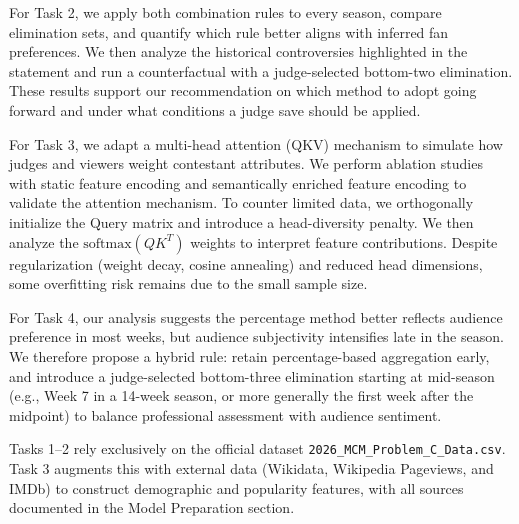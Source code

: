 For Task 2, we apply both combination rules to every season, compare elimination sets, and quantify which rule better aligns with inferred fan preferences. We then analyze the historical controversies highlighted in the statement and run a counterfactual with a judge-selected bottom-two elimination. These results support our recommendation on which method to adopt going forward and under what conditions a judge save should be applied.

For Task 3, we adapt a multi-head attention (QKV) mechanism to simulate how judges and viewers weight contestant attributes. We perform ablation studies with static feature encoding and semantically enriched feature encoding to validate the attention mechanism. To counter limited data, we orthogonally initialize the Query matrix and introduce a head-diversity penalty. We then analyze the \(\mathrm{softmax}(QK^T)\) weights to interpret feature contributions. Despite regularization (weight decay, cosine annealing) and reduced head dimensions, some overfitting risk remains due to the small sample size.

For Task 4, our analysis suggests the percentage method better reflects audience preference in most weeks, but audience subjectivity intensifies late in the season. We therefore propose a hybrid rule: retain percentage-based aggregation early, and introduce a judge-selected bottom-three elimination starting at mid-season (e.g., Week 7 in a 14-week season, or more generally the first week after the midpoint) to balance professional assessment with audience sentiment.
\par
Tasks 1--2 rely exclusively on the official dataset \texttt{2026\_MCM\_Problem\_C\_Data.csv}. Task 3 augments this with external data (Wikidata, Wikipedia Pageviews, and IMDb) to construct demographic and popularity features, with all sources documented in the Model Preparation section.
